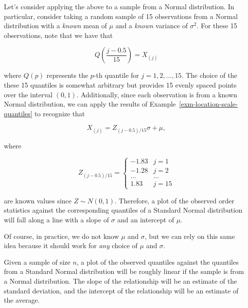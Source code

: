 \documentclass[
  letterpaper,
  DIV=11,
  numbers=noendperiod]{scrreprt}
\theoremstyle{definition}
\theoremstyle{definition}
\theoremstyle{plain}
\theoremstyle{remark}
\begin{document}
Let's consider applying the above to a sample from a Normal
distribution. In particular, consider taking a random sample of 15
observations from a Normal distribution with a \emph{known} mean of
\(\mu\) and a \emph{known} variance of \(\sigma^2\). For these 15
observations, note that we have that

\[Q\left(\frac{j - 0.5}{15}\right) = X_{(j)}\]

where \(Q(p)\) represents the \(p\)-th quantile for
\(j = 1,2,\dotsc, 15\). The choice of the these 15 quantiles is somewhat
arbitrary but provides 15 evenly spaced points over the interval
\((0, 1)\). Additionally, since each observation is from a known Normal
distribution, we can apply the results of
Example~\ref{exm-location-scale-quantiles} to recognize that

\[X_{(j)} = Z_{(j - 0.5)/15} \sigma + \mu,\]

where

\[Z_{(j - 0.5)/15} = \begin{cases} -1.83 & j = 1 \\ -1.28 & j = 2 \\ \dotsc & \dotsc \\ 1.83 & j = 15\end{cases}\]

are known values since \(Z \sim N(0, 1)\). Therefore, a plot of the
observed order statistics against the corresponding quantiles of a
Standard Normal distribution will fall along a line with a slope of
\(\sigma\) and an intercept of \(\mu\).

Of course, in practice, we do not know \(\mu\) and \(\sigma\), but we
can rely on this same idea because it should work for \emph{any} choice
of \(\mu\) and \(\sigma\).

\begin{tcolorbox}[enhanced jigsaw, title=\textcolor{quarto-callout-note-color}{\faInfo}\hspace{0.5em}{Assessing Normality}, colbacktitle=quarto-callout-note-color!10!white, titlerule=0mm, toptitle=1mm, breakable, bottomtitle=1mm, colframe=quarto-callout-note-color-frame, opacitybacktitle=0.6, bottomrule=.15mm, arc=.35mm, toprule=.15mm, colback=white, rightrule=.15mm, coltitle=black, leftrule=.75mm, left=2mm, opacityback=0]

Given a sample of size \(n\), a plot of the observed quantiles against
the quantiles from a Standard Normal distribution will be roughly linear
if the sample is from a Normal distribution. The slope of the
relationship will be an estimate of the standard deviation, and the
intercept of the relationship will be an estimate of the average.

\end{tcolorbox}
\end{document}

